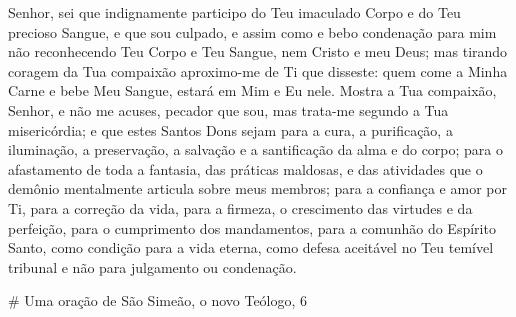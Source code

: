 \documentclass{subfiles}
\begin{document}
Senhor, sei que indignamente participo do Teu imaculado Corpo e do Teu precioso
Sangue, e que sou culpado, e assim como e bebo condenação para mim não
reconhecendo Teu Corpo e Teu Sangue, nem Cristo e meu Deus; mas tirando coragem
da Tua compaixão aproximo-me de Ti que disseste: quem come a Minha Carne e bebe
Meu Sangue, estará em Mim e Eu nele. Mostra a Tua compaixão, Senhor, e não me
acuses, pecador que sou, mas trata-me segundo a Tua misericórdia; e que estes
Santos Dons sejam para a cura, a purificação, a iluminação, a preservação, a
salvação e a santificação da alma e do corpo; para o afastamento de toda a
fantasia, das práticas maldosas, e das atividades que o demônio mentalmente
articula sobre meus membros; para a confiança e amor por Ti, para a correção da
vida, para a firmeza, o crescimento das virtudes e da perfeição, para o
cumprimento dos mandamentos, para a comunhão do Espírito Santo, como condição
para a vida eterna, como defesa aceitável no Teu temível tribunal e não para
julgamento ou condenação.


# Uma oração de São Simeão, o novo Teólogo, 6
\end{document}

